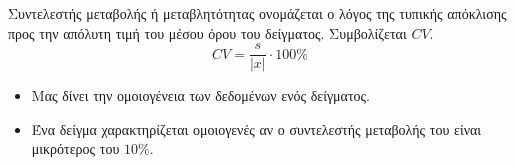 Συντελεστής μεταβολής ή μεταβλητότητας ονομάζεται ο λόγος της τυπικής απόκλισης προς την απόλυτη τιμή του μέσου όρου του δείγματος. Συμβολίζεται $ CV $.
\[ CV=\frac{s}{|x|}\cdot 100\% \]
\begin{itemize}
\item Μας δίνει την ομοιογένεια των δεδομένων ενός δείγματος.
\item Ένα δείγμα χαρακτηρίζεται ομοιογενές αν ο συντελεστής μεταβολής του είναι μικρότερος του $ 10\% $.
\end{itemize}
